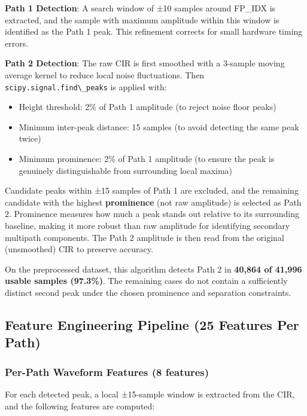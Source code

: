 \documentclass[12pt,a4paper]{article}
\newcommand{\passthrough}[1]{#1}
\providecommand{\passthrough}[1]{#1}
\providecommand{\tightlist}{%
  \setlength{\itemsep}{0pt}\setlength{\parskip}{0pt}}
\begin{document}
\textbf{Path 1 Detection}: A search window of ±10 samples around FP\_IDX
is extracted, and the sample with maximum amplitude within this window
is identified as the Path 1 peak. This refinement corrects for small
hardware timing errors.

\textbf{Path 2 Detection}: The raw CIR is first smoothed with a 3-sample
moving average kernel to reduce local noise fluctuations. Then
\passthrough{\lstinline!scipy.signal.find\_peaks!} is applied with:

\begin{itemize}
\tightlist
\item
  Height threshold: 2\% of Path 1 amplitude (to reject noise floor
  peaks)
\item
  Minimum inter-peak distance: 15 samples (to avoid detecting the same
  peak twice)
\item
  Minimum prominence: 2\% of Path 1 amplitude (to ensure the peak is
  genuinely distinguishable from surrounding local maxima)
\end{itemize}

Candidate peaks within ±15 samples of Path 1 are excluded, and the
remaining candidate with the highest \textbf{prominence} (not raw
amplitude) is selected as Path 2. Prominence measures how much a peak
stands out relative to its surrounding baseline, making it more robust
than raw amplitude for identifying secondary multipath components. The
Path 2 amplitude is then read from the original (unsmoothed) CIR to
preserve accuracy.

On the preprocessed dataset, this algorithm detects Path 2 in
\textbf{40,864 of 41,996 usable samples (97.3\%)}. The remaining cases
do not contain a sufficiently distinct second peak under the chosen
prominence and separation constraints.

\subsection{Feature Engineering Pipeline (25 Features Per
Path)}\label{feature-engineering-pipeline-25-features-per-path}

\subsubsection{Per-Path Waveform Features (8
features)}\label{per-path-waveform-features-8-features}

For each detected peak, a local ±15-sample window is extracted from the
CIR, and the following features are computed:
\end{document}

